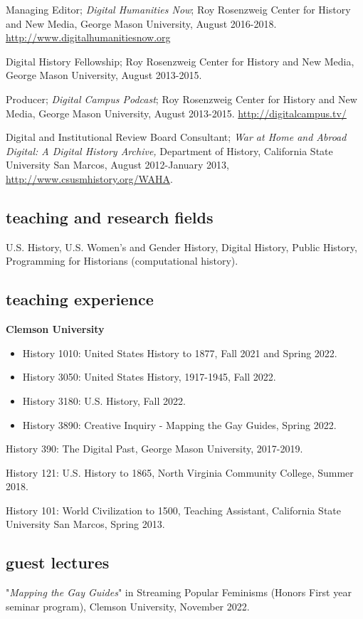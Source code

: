 \documentclass[11pt]{article}
\begin{document}
Managing Editor; \emph{Digital Humanities Now}; Roy Rosenzweig Center for History and New Media, George Mason University, August 2016-2018. \url{http://www.digitalhumanitiesnow.org}

Digital History Fellowship; Roy Rosenzweig Center for History and New Media, George Mason University, August 2013-2015.

Producer; \emph{Digital Campus Podcast}; Roy Rosenzweig Center for History and New Media, George Mason University, August 2013-2015. \url{http://digitalcampus.tv/}

Digital and Institutional Review Board Consultant; \emph{War at Home and Abroad Digital: A Digital History Archive,} Department of History, California State University San Marcos, August 2012-January 2013, \url{http://www.csusmhistory.org/WAHA}.

\subsection{teaching and research fields}
U.S. History, U.S. Women's and Gender History, Digital History, Public History, Programming for Historians (computational history).

\subsection{teaching experience}

\textbf{Clemson University}
\begin{itemize}
  \item History 1010: United States History to 1877, Fall 2021 and Spring 2022.
  \item History 3050: United States History, 1917-1945, Fall 2022.
  \item History 3180: U.S. History, Fall 2022. 
  \item History 3890: Creative Inquiry - Mapping the Gay Guides, Spring 2022.
\end{itemize}
 
History 390: The Digital Past, George Mason University, 2017-2019.

History 121: U.S. History to 1865, North Virginia Community College, Summer 2018.

History 101: World Civilization to 1500, Teaching Assistant, California State University San Marcos, Spring 2013.

\subsection{guest lectures}
"\emph{Mapping the Gay Guides}" in Streaming Popular Feminisms (Honors First year seminar program), Clemson University, November 2022. 
\end{document}
